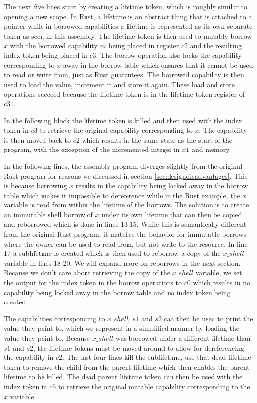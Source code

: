 The next five lines start by creating a lifetime token, which is roughly similar to opening a new scope.
In Rust, a lifetime is an abstract thing that is attached to a pointer while in borrowed capabilities a lifetime is represented as its own separate token as seen in this assembly.
The lifetime token is then used to mutably borrow $x$ with the borrowed capability $m$ being placed in register $c2$ and the resulting index token being placed in $c3$.
The borrow operation also locks the capability corresponding to $x$ away in the borrow table which ensures that it cannot be used to read or write from, just as Rust guarantees.
The borrowed capability is then used to load the value, increment it and store it again.
These load and store operations succeed because the lifetime token is in the lifetime token register of $c31$.

In the following block the lifetime token is killed and then used with the index token in $c3$ to retrieve the original capability corresponding to $x$.
The capability is then moved back to $c2$ which results in the same state as the start of the program, with the exception of the incremented integer in $x1$ and memory.

In the following lines, the assembly program diverges slightly from the original Rust program for reasons we discussed in section \ref{sec:designdisadvantages}.
This is because borrowing $x$ results in the capability being locked away in the borrow table which makes it impossible to dereference while in the Rust example, the $x$ variable is read from within the lifetime of the borrows.
The solution is to create an immutable shell borrow of $x$ under its own lifetime that can then be copied and reborrowed which is done in lines 13-15.
While this is semantically different from the original Rust program, it matches the behavior for immutable borrows where the owner can be used to read from, but not write to the resource.
In line 17 a sublifetime is created which is then used to reborrow a copy of the $x\_shell$ variable in lines 18-20.
We will expand more on reborrows in the next section.
Because we don't care about retrieving the copy of the $x\_shell$ variable, we set the output for the index token in the borrow operations to $c0$ which results in no capability being locked away in the borrow table and no index token being created.

The capabilities corresponding to $x\_shell$, $s1$ and $s2$ can then be used to print the value they point to, which we represent in a simplified manner by loading the value they point to.
Because $x\_shell$ was borrowed under a different lifetime than $s1$ and $s2$, the lifetime tokens must be moved around to allow for dereferencing the capability in $c2$.
The last four lines kill the sublifetime, use that dead lifetime token to remove the child from the parent lifetime which then enables the parent lifetime to be killed.
The dead parent lifetime token can then be used with the index token in $c5$ to retrieve the original mutable capability corresponding to the $x$ variable.

